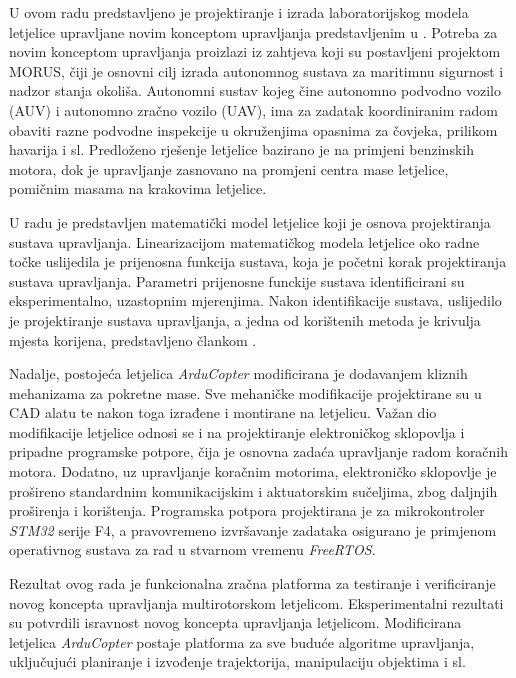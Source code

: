 \documentclass[11pt,a4paper]{article}
\begin{document}
U ovom radu predstavljeno je projektiranje i izrada laboratorijskog modela letjelice upravljane novim konceptom upravljanja predstavljenim u \cite{haus1}. Potreba za novim konceptom upravljanja proizlazi iz zahtjeva koji su postavljeni projektom MORUS, čiji je osnovni cilj izrada autonomnog sustava za maritimnu sigurnost i nadzor stanja okoliša. Autonomni sustav kojeg čine autonomno podvodno vozilo (AUV) i autonomno zračno vozilo (UAV), ima za zadatak koordiniranim radom obaviti razne podvodne inspekcije u okruženjima opasnima za čovjeka, prilikom havarija i sl. Predloženo rješenje letjelice bazirano je na primjeni benzinskih motora, dok je upravljanje zasnovano na promjeni centra mase letjelice, pomičnim masama na krakovima letjelice. 


\medskip
U radu je predstavljen matematički model letjelice koji je osnova projektiranja sustava upravljanja. Linearizacijom matematičkog modela letjelice oko radne točke uslijedila je prijenosna funkcija sustava, koja je početni korak projektiranja sustava upravljanja. Parametri prijenosne funckije sustava identificirani su eksperimentalno, uzastopnim mjerenjima. Nakon identifikacije sustava, uslijedilo je projektiranje sustava upravljanja, a jedna od korištenih metoda je krivulja mjesta korijena, predstavljeno člankom \cite{haus2}.

\medskip

Nadalje, postojeća letjelica \textit{ArduCopter} modificirana je dodavanjem kliznih mehanizama za pokretne mase. Sve mehaničke modifikacije projektirane su u CAD alatu te nakon toga izrađene i montirane na letjelicu. Važan dio modifikacije letjelice odnosi se i na projektiranje elektroničkog sklopovlja i pripadne programske potpore, čija je osnovna zadaća upravljanje radom koračnih motora. Dodatno, uz upravljanje koračnim motorima, elektroničko sklopovlje je prošireno standardnim komunikacijskim i aktuatorskim sučeljima, zbog daljnjih proširenja i korištenja. Programska potpora projektirana je za mikrokontroler \textit{STM32} serije F4, a pravovremeno izvršavanje zadataka osigurano je primjenom operativnog sustava za rad u stvarnom vremenu \textit{FreeRTOS}.


\medskip
Rezultat ovog rada je funkcionalna zračna platforma za testiranje i verificiranje novog koncepta upravljanja multirotorskom letjelicom. Eksperimentalni rezultati su potvrdili isravnost novog koncepta upravljanja letjelicom. Modificirana letjelica \textit{ArduCopter} postaje platforma za sve buduće algoritme upravljanja, uključujući planiranje i izvođenje trajektorija, manipulaciju objektima i sl.
\end{document}
